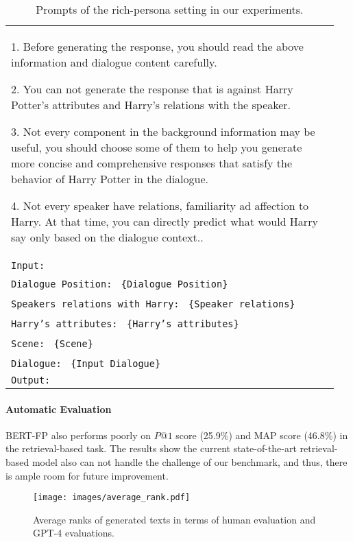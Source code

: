 \documentclass[11pt]{article}
\begin{document}
\begin{table*}[!t]
\begin{tabular}{p{0.95\linewidth}}
1. Before generating the response, you should read the above information and dialogue content carefully.

2. You can not generate the response that is against Harry Potter's attributes and Harry’s relations with the speaker.

3. Not every component in the background information may  be useful, you should choose some of them to help you generate more concise and comprehensive responses that satisfy the behavior of Harry Potter in the dialogue.

4. Not every speaker have relations, familiarity ad affection to Harry. At that time, you can directly predict what would Harry say only based on the dialogue context..\\
\texttt{Input:} \\
 \texttt{Dialogue Position:} \texttt{ \{Dialogue Position\}} \\
  \texttt{Speakers relations with Harry:} \texttt{ \{Speaker relations\}} \\
\texttt{Harry's attributes:} \texttt{ \{Harry's attributes\}} \\
\texttt{Scene:} \texttt{ \{Scene\}} \\
\texttt{Dialogue:} \texttt{ \{Input Dialogue\}} \\
\texttt{Output:} \\
\bottomrule
\end{tabular}
\caption{Prompts of the rich-persona setting in our experiments. } \label{table:persona}
\vspace{-5mm}
\end{table*} 
\paragraph{Automatic Evaluation}


BERT-FP also performs poorly on $P@1$ score (25.9$\%$) and MAP score (46.8$\%$)  in the retrieval-based task. The results show the current state-of-the-art retrieval-based model also can not handle the challenge of our benchmark, and thus, there is ample room for future improvement.


\begin{figure*}
    \centering
    \texttt{[image: images/average\_rank.pdf]}
       \caption{Average ranks of generated texts in terms of human evaluation and GPT-4 evaluations.}
       \vspace{-15pt}
    \label{fig:average_rank}
\end{figure*}
\end{document}
